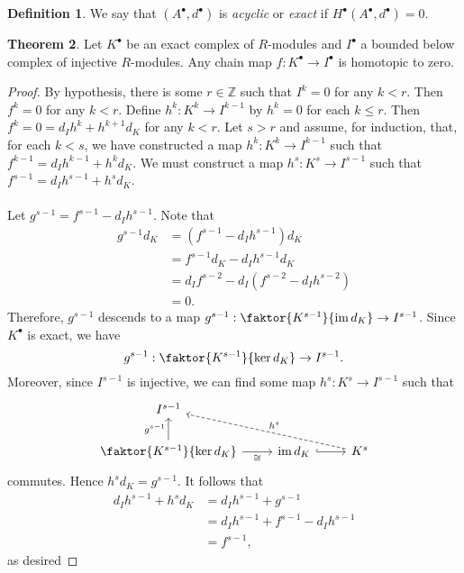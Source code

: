 \documentclass[10pt,letterpaper,cm]{nupset}
\theoremstyle{definition}
\newtheorem{definition}{Definition}[subsection]
\theoremstyle{theorem}
\newtheorem{theorem}[definition]{Theorem}
\theoremstyle{remark}
\newcommand{\Z}{\mathbb Z}
\newcommand{\1}{\mathbf{1}}
\newcommand{\0}{\vec 0}
\DeclareMathOperator{\im}{im}
\begin{document}
\begin{definition}
We say that $\left(A^{\bullet}, d^{\bullet}\right)$ is \textit{acyclic} or \textit{exact} if $H^{\bullet}\left(A^{\bullet}, d^{\bullet}\right)=0$.
\end{definition}

\medskip

\begin{theorem}
Let $K^{\bullet}$ be an exact complex of $R$-modules and $I^{\bullet}$ a bounded below complex of injective $R$-modules. Any chain map $f: K^{\bullet} \to I^{\bullet}$ is homotopic to zero.
\end{theorem}
\begin{proof}
By hypothesis, there is some $r\in \Z$ such that $I^k =0$ for any $k<r$. Then $f^k =0$ for any $k<r$. Define $h^k: K^k \to I^{k-1}$ by $h^k =0$ for each $k\leq r$. Then $f^{k} = 0 = d_I{h^{k}} + h^{k+1}{d_K}$ for any $k <r$. Let $s> r$ and assume, for induction, that, for each $k<s$, we have constructed a map $h^k : K^k \to I^{k-1}$ such that $f^{k-1} = d_I{h^{k-1}} + h^{k}{d_K}$. We must construct a map $h^s : K^s \to I^{s-1}$ such that $f^{s-1} = d_I{h^{s-1}} + h^{s}{d_K}$.
\\ \\ Let $g^{s-1} = f^{s-1} - d_I{h^{s-1}}$. Note that 
\begin{align*}
g^{s-1}{d_K} & = \left(f^{s-1} - d_I{h^{s-1}}\right){d_K}
\\ & = f^{s-1}{d_K} -  d_I{h^{s-1}}{d_K}
\\ & = d_I{f^{s-2}} - d_I\left(f^{s-2} - d_Ih^{s-2}\right)
\\ & = 0.
\end{align*}
Therefore, $g^{s-1}$ descends to a map ${g}^{s-1} : \faktor{K^{s-1}}{\im{d_K}} \to I^{s-1}$. Since $K^{\bullet}$ is exact, we have $${g}^{s-1} : \faktor{K^{s-1}}{\ker{d_K}} \to I^{s-1}.$$ Moreover, since $I^{s-1}$ is injective, we can find some map $h^s : K^s \to I^{s-1}$ such that
\[
\begin{tikzcd}
I^{s-1}                                                              &                          &                                 \\
\faktor{K^{s-1}}{\ker{d_K}} \arrow[u, "g^{s-1}"] \arrow[r, "\cong"'] & \im{d_K} \arrow[r, hook] & K^s \arrow[llu, "h^s"', dashed]
\end{tikzcd}
\] commutes. Hence $h^s{d_K} = g^{s-1}$. It follows that
\begin{align*}
  d_I{h^{s-1}} + h^{s}{d_K} & = d_I{h^{s-1}} + g^{s-1}
\\ & = d_I{h^{s-1}} + f^{s-1} - d_I{h^{s-1}}
\\ & = f^{s-1},
\end{align*}
as desired
\end{proof}
\end{document}
